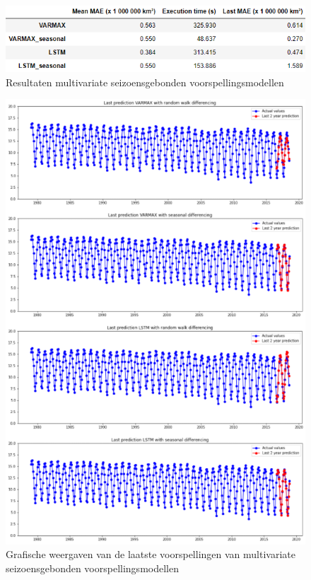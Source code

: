 \begin{figure}
    \centering
    \caption{Resultaten multivariate seizoensgebonden voorspellingsmodellen}
    \label{fig:mvsresults}
    \includegraphics[width=0.8\linewidth]{mv_s_results}
\end{figure}


\begin{figure}
    \centering
    \caption{Grafische weergaven van de laatste voorspellingen van multivariate seizoensgebonden voorspellingsmodellen}
    \label{fig:mvsresultsgraphs}
    \includegraphics[width=1\linewidth]{mv_s_results_graphs}
\end{figure}

